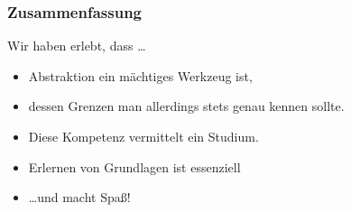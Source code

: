 
\begin{frame}
	\frametitle{Zusammenfassung}

	\begin{block}{Wir haben erlebt, dass \ldots}
		\begin{itemize}
			\item Abstraktion ein mächtiges Werkzeug ist,
			\item dessen Grenzen man allerdings stets genau kennen sollte.
			\item Diese Kompetenz vermittelt ein Studium.
			\item Erlernen von Grundlagen ist essenziell
			\item \ldots und macht Spaß!
		\end{itemize}
	\end{block}
\end{frame}

%
